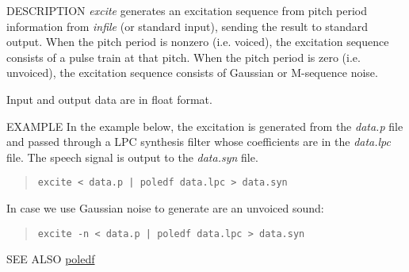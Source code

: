 \begin{synopsis}
\item [excite] [ --p $P$ ] [ --i $I$ ] [ --n ] [ --s $S$ ] [ {\em infile} ]
\end{synopsis}

\begin{qsection}{DESCRIPTION}
{\em excite} generates an excitation sequence 
from pitch period information from {\em infile} (or standard input), 
sending the result to standard output. 
When the pitch period is nonzero (i.e. voiced), 
the excitation sequence consists of a pulse train at that pitch. 
When the pitch period is zero (i.e. unvoiced),
the excitation sequence consists of Gaussian or M-sequence noise.

Input and output data are in float format.
\end{qsection}

\begin{options}
\end{options}

\begin{qsection}{EXAMPLE}
In the example below, the excitation is generated from the
{\em data.p} file and passed through a LPC synthesis filter
whose coefficients are in the {\em data.lpc} file.
The speech signal is output to the {\em data.syn} file.
\begin{quote}
 \verb!excite < data.p | poledf data.lpc > data.syn!
\end{quote} 
In case we use Gaussian noise to generate are an unvoiced sound:
\begin{quote}
 \verb!excite -n < data.p | poledf data.lpc > data.syn!
\end{quote}
\end{qsection}

\begin{qsection}{SEE ALSO}
\hyperlink{poledf}{poledf}
\end{qsection}
